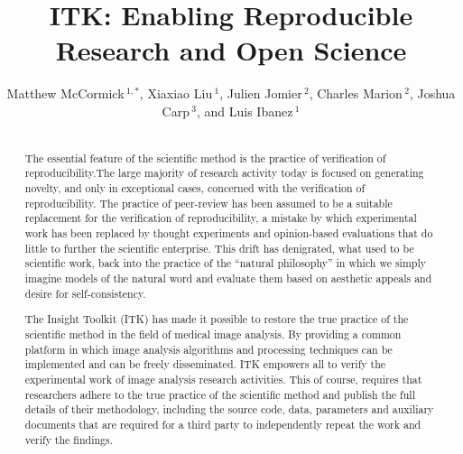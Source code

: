 \documentclass{frontiersENG} %
\def\journal{Neuroinformatics}%
\def\firstAuthorLast{McCormick {et~al.}} %
\def\Authors{Matthew McCormick\,$^{1,*}$,
  Xiaxiao Liu\,$^{1}$,
  Julien Jomier\,$^{2}$,
  Charles Marion\,$^{2}$,
  Joshua Carp\,$^{3}$,
  and Luis Ibanez\,$^1$}
\begin{document}
\onecolumn
{}

\title[ITK Reproducible Research]{ITK: Enabling Reproducible Research and Open Science}
\author[\firstAuthorLast ]{\Authors}
\address{}
\correspondance{}
\extraAuth{}%

\maketitle
\begin{abstract}

\section{}
The essential feature of the scientific method is the practice of verification of reproducibility.The large majority of research activity today is focused on generating novelty, and only in exceptional cases, concerned with the verification of reproducibility. The practice of peer-review has been assumed to be a suitable replacement for the verification of reproducibility, a mistake by which experimental work has been replaced by thought experiments and opinion-based evaluations that do little to further the scientific enterprise. This drift has denigrated, what used to be scientific work, back into the practice of the “natural philosophy” in which we simply imagine models of the natural word and evaluate them based on aesthetic appeals and desire for self-consistency.

The Insight Toolkit (ITK) has made it possible to restore the true practice of the scientific method in the field of medical image analysis. By providing a common platform in which image analysis algorithms and processing techniques can be implemented and can be freely disseminated. ITK empowers all to verify the experimental work of image analysis research activities. This of course, requires that researchers adhere to the true practice of the scientific method and publish the full details of their methodology, including the source code, data, parameters and auxiliary documents that are required for a third party to independently repeat the work and verify the findings.


\end{abstract}
\end{document}
